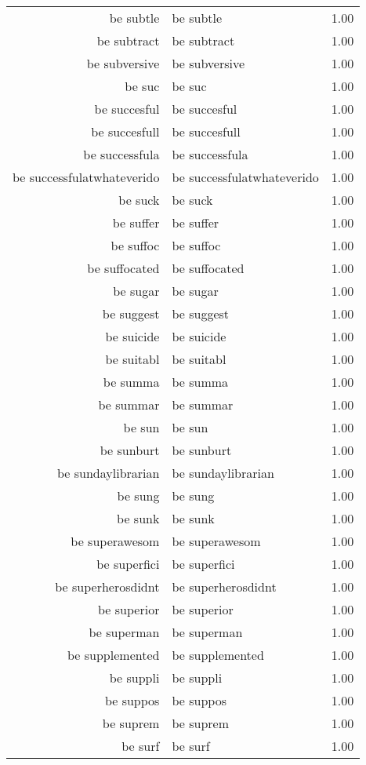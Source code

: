 \begin{table}[ht]
\begin{tabular}{rlr}
  be subtle & be subtle & 1.00 \\ 
  be subtract & be subtract & 1.00 \\ 
  be subversive & be subversive & 1.00 \\ 
  be suc & be suc & 1.00 \\ 
  be succesful & be succesful & 1.00 \\ 
  be succesfull & be succesfull & 1.00 \\ 
  be successfula & be successfula & 1.00 \\ 
  be successfulatwhateverido & be successfulatwhateverido & 1.00 \\ 
  be suck & be suck & 1.00 \\ 
  be suffer & be suffer & 1.00 \\ 
  be suffoc & be suffoc & 1.00 \\ 
  be suffocated & be suffocated & 1.00 \\ 
  be sugar & be sugar & 1.00 \\ 
  be suggest & be suggest & 1.00 \\ 
  be suicide & be suicide & 1.00 \\ 
  be suitabl & be suitabl & 1.00 \\ 
  be summa & be summa & 1.00 \\ 
  be summar & be summar & 1.00 \\ 
  be sun & be sun & 1.00 \\ 
  be sunburt & be sunburt & 1.00 \\ 
  be sundaylibrarian & be sundaylibrarian & 1.00 \\ 
  be sung & be sung & 1.00 \\ 
  be sunk & be sunk & 1.00 \\ 
  be superawesom & be superawesom & 1.00 \\ 
  be superfici & be superfici & 1.00 \\ 
  be superherosdidnt & be superherosdidnt & 1.00 \\ 
  be superior & be superior & 1.00 \\ 
  be superman & be superman & 1.00 \\ 
  be supplemented & be supplemented & 1.00 \\ 
  be suppli & be suppli & 1.00 \\ 
  be suppos & be suppos & 1.00 \\ 
  be suprem & be suprem & 1.00 \\ 
  be surf & be surf & 1.00 \\ 

\end{tabular}
\end{table}
